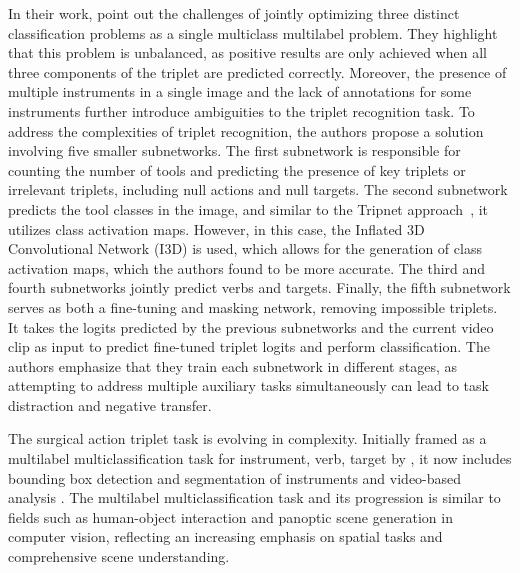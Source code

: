 \indent In their work, \citet{chen2023surgical} point out the challenges of jointly optimizing three distinct classification problems as a single multiclass multilabel problem. They highlight that this problem is unbalanced, as positive results are only achieved when all three components of the triplet are predicted correctly. Moreover, the presence of multiple instruments in a single image and the lack of annotations for some instruments further introduce ambiguities to the triplet recognition task.
To address the complexities of triplet recognition, the authors propose a solution involving five smaller subnetworks. The first subnetwork is responsible for counting the number of tools and predicting the presence of key triplets or irrelevant triplets, including null actions and null targets.
The second subnetwork predicts the tool classes in the image, and similar to the Tripnet approach~\citep{1nywoye_rec_action_triplets}, it utilizes class activation maps. However, in this case, the Inflated 3D Convolutional Network (I3D) \citep{carreira2017quo} is used, which allows for the generation of class activation maps, which the authors found to be more accurate.
The third and fourth subnetworks jointly predict verbs and targets. Finally, the fifth subnetwork serves as both a fine-tuning and masking network, removing impossible triplets. It takes the logits predicted by the previous subnetworks and the current video clip as input to predict fine-tuned triplet logits and perform classification.
The authors emphasize that they train each subnetwork in different stages, as attempting to address multiple auxiliary tasks simultaneously can lead to task distraction and negative transfer. 

The surgical action triplet task is evolving in complexity. Initially framed as a multilabel multiclassification task for \textlangle{}instrument, verb, target\textrangle{} by \citet{1nywoye_rec_action_triplets,NWOYE2022102433_rendevous}, it now includes bounding box detection and segmentation of instruments \citep{sharma2023surgical} and video-based analysis \citep{1nywoye_rec_action_triplets}. The multilabel multiclassification task and its progression is similar to fields such as human-object interaction \citep{kim2021hotr} and panoptic scene generation \citep{yang2022panoptic} in computer vision, reflecting an increasing emphasis on spatial tasks and comprehensive scene understanding.


